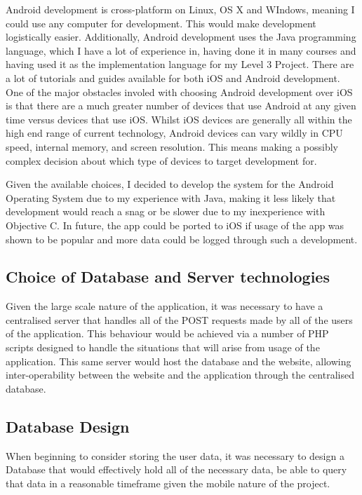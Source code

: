 \documentclass{l4proj}
\begin{document}
Android development is cross-platform on Linux, OS X and WIndows, meaning I could use any computer for development. This would make development logistically easier. Additionally, Android development uses the Java programming language, which I have a lot of experience in, having done it in many courses and having used it as the implementation language for my Level 3 Project. There are a lot of tutorials and guides available for both iOS and Android development. One of the major obstacles involed with choosing Android development over iOS is that there are a much greater number of devices that use Android at any given time versus devices that use iOS. Whilst iOS devices are generally all within the high end range of current technology, Android devices can vary wildly in CPU speed, internal memory, and screen resolution. This means making a possibly complex decision about which type of devices to target development for.

Given the available choices, I decided to develop the system for the Android Operating System due to my experience with Java, making it less likely that development would reach a snag or be slower due to my inexperience with Objective C. In future, the app could be ported to iOS if usage of the app was shown to be popular and more data could be logged through such a development.

\subsection{Choice of Database and Server technologies}

Given the large scale nature of the application, it was necessary to have a centralised server that handles all of the POST requests made by all of the users of the application. This behaviour would be achieved via a number of PHP scripts designed to handle the situations that will arise from usage of the application. This same server would host the database and the website, allowing inter-operability between the website and the application through the centralised database.

\subsection{Database Design}

When beginning to consider storing the user data, it was necessary to design a Database that would effectively hold all of the necessary data, be able to query that data in a reasonable timeframe given the mobile nature of the project.
\end{document}

